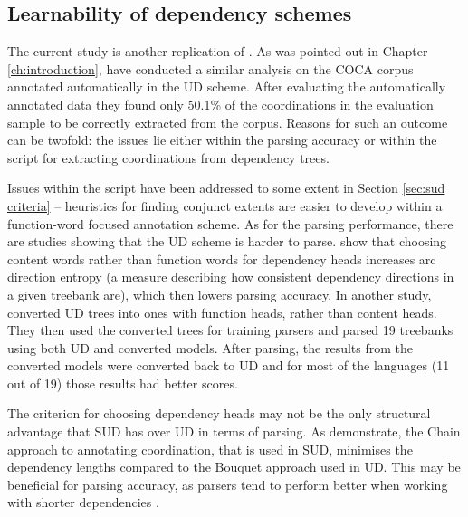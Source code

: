 \subsection{Learnability of dependency schemes}\label{sec:learnability}
The current study is another replication of \cite{prz:woz:23}. As was pointed out in Chapter \ref{ch:introduction}, \cite{pbg2023} have conducted a similar analysis on the COCA corpus annotated automatically in the UD scheme. After evaluating the automatically annotated data they found only 50.1\% of the coordinations in the evaluation sample to be correctly extracted from the corpus. Reasons for such an outcome can be twofold: the issues lie either within the parsing accuracy or within the script for extracting coordinations from dependency trees. 

Issues within the script have been addressed to some extent in Section \ref{sec:sud criteria} -- heuristics for finding conjunct extents are easier to develop within a function-word focused annotation scheme. As for the parsing performance, there are studies showing that the UD scheme is harder to parse. \cite{rehbein-etal-2017-universal} show that choosing content words rather than function words for dependency heads increases arc direction entropy (a measure describing how consistent dependency directions in a given treebank are), which then lowers parsing accuracy. In another study, \cite{kohita-etal-2017-multilingual} converted UD trees into ones with function heads, rather than content heads. They then used the converted trees for training parsers and parsed 19 treebanks using both UD and converted models. After parsing, the results from the converted models were converted back to UD and for most of the languages (11 out of 19) those results had better scores. 

The criterion for choosing dependency heads may not be the only structural advantage that SUD has over UD in terms of parsing. As \cite{gerdes-etal-2018-sud} demonstrate, the Chain approach to annotating coordination, that is used in SUD, minimises the dependency lengths compared to the Bouquet approach used in UD. This may be beneficial for parsing accuracy, as parsers tend to perform better when working with shorter dependencies \citep{nilsson-etal-2006-graph, eisner-smith-2005-parsing}. 

